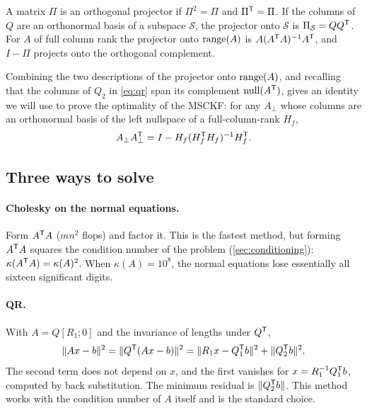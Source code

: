 \begin{definition}
A matrix $\Pi$ is an orthogonal projector if $\Pi^2 = \Pi$ and $\Pi^{\mathsf{T}} = \Pi$. If the columns of $Q$ are an orthonormal basis of a subspace
$\mathcal{S}$, the projector onto $\mathcal{S}$ is $\Pi_{\mathcal{S}} = QQ^{\mathsf{T}}$. For $A$ of full column rank the projector onto $\operatorname{range}(A)$ is
$A(A^{\mathsf{T}} A)^{-1} A^{\mathsf{T}}$, and $I - \Pi$ projects onto the orthogonal complement.
\end{definition}

Combining the two descriptions of the projector onto $\operatorname{range}(A)$, and recalling that the columns of $Q_2$ in \eqref{eq:qr} span its
complement $\operatorname{null}(A^{\mathsf{T}})$, gives an identity we will use to prove the optimality of the MSCKF: for any $A_\perp$ whose columns are an
orthonormal basis of the left nullspace of a full-column-rank $H_f$,
\begin{equation}
  A_\perp A_\perp^{\mathsf{T}} = I - H_f (H_f^{\mathsf{T}} H_f)^{-1} H_f^{\mathsf{T}} .
  \label{eq:nullspace-projector}
\end{equation}

\subsection{Three ways to solve}

\paragraph{Cholesky on the normal equations.} Form $A^{\mathsf{T}} A$ ($mn^2$ flops) and factor it. This is the fastest method, but forming
$A^{\mathsf{T}} A$ squares the condition number of the problem (\cref{sec:conditioning}): $\kappa(A^{\mathsf{T}} A) = \kappa(A)^2$. When $\kappa(A) = 10^8$,
the normal equations lose essentially all sixteen significant digits.

\paragraph{QR.} With $A = Q[R_1; 0]$ and the invariance of lengths under $Q^{\mathsf{T}}$,
\begin{equation}
  \|Ax - b\|^2 = \|Q^{\mathsf{T}}(Ax - b)\|^2 = \|R_1x - Q_1^{\mathsf{T}} b\|^2 + \|Q_2^{\mathsf{T}} b\|^2 .
\end{equation}
The second term does not depend on $x$, and the first vanishes for $x = R_1^{-1} Q_1^{\mathsf{T}} b$, computed by back substitution. The minimum
residual is $\|Q_2^{\mathsf{T}} b\|$. This method works with the condition number of $A$ itself and is the standard choice.

